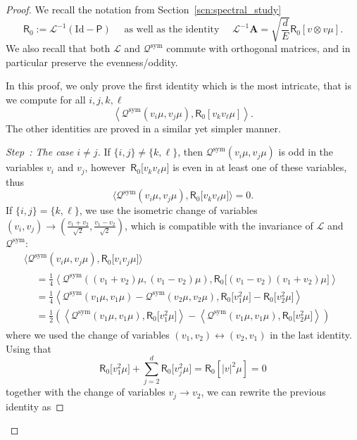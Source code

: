 \documentclass[10pt]{amsart}
\theoremstyle{definition}\newtheorem{defi}[theo]{Definition}\newtheorem{rema}[theo]{Remark}\newtheorem{exam}[theo]{Example}\newtheorem{exem}[theo]{Example}\newtheorem{nota}[theo]{Notation}
\newcommand{\sym}{\mathrm{sym}}
\newcommand{\Id}{\mathrm{Id}}
\newcommand{\sfR}{\mathsf{R}}
\newcommand{\BurA}{{\mathbf{A}}}
\newcommand{\LL}{\mathcal{L}}
\newcommand{\PP}{\mathsf{P}}
\newcommand{\QQ}{\mathcal{Q}}
\newcommand{\la}{\langle}
\newcommand{\ra}{\rangle}
\newcounter{stepcount}
\newenvironment{step}[1]{\refstepcounter{stepcount}\begin{proof}[Step~\thestepcount: #1]}{\let\qed\relax\end{proof}}
\begin{document}
\begin{proof}
We recall the notation from Section~\ref{scn:spectral_study}
\[
\sfR_0 := \LL^{-1} \left(\Id - \PP\right) \quad \text{ as well as the identity } \quad \LL^{-1}\BurA = \sqrt{ \frac{d}{E} } \sfR_0 \left[v \otimes v \mu \right].
\]
We also recall that both $\LL$ and $\QQ^\sym$ commute with orthogonal matrices, and in particular preserve the evenness/oddity.

In this proof, we only prove the first identity which is the most intricate, that is we compute for all $i, j, k, \ell$
\[
\left\la \QQ^\sym(v_i \mu, v_j \mu), \sfR_0 \left[v_k v_\ell \mu \right] \right\ra.
\]
The other identities are proved in a similar yet simpler manner.

\setcounter{stepcount}{0}
\begin{step}{{The case $i \neq j$}}
If $\{ i, j \} \neq \{ k, \ell \}$, then $\QQ^\sym(v_i \mu, v_j \mu)$ is odd in the variables $v_i$ and $v_j$, however~$\sfR_0 \big[v_k v_\ell \mu \big]$ is even in at least one of these variables, thus
\[
\big\la \QQ^\sym(v_i \mu, v_j \mu), \sfR_0 \big[v_k v_\ell \mu \big] \big\ra = 0.
\]
If $\{ i, j \} = \{ k, \ell \}$, we use the isometric change of variables $(v_i, v_j) \rightarrow \left(\frac{v_1 + v_2}{\sqrt{2} }, \frac{v_1 - v_2}{\sqrt{2} } \right)$, which is compatible with the invariance of $\LL$ and $\QQ^\sym$:
\begin{multline*}
\big\la \QQ^\sym(v_i \mu, v_j \mu), \sfR_0 \big[v_i v_j \mu \big] \big\ra\\
\begin{aligned}
&= \frac{1}{4} \left\la \QQ^\sym((v_1 + v_2) \mu, (v_1 - v_2) \mu), \sfR_0 \big[(v_1-v_2) (v_1 + v_2) \mu \big] \right\ra \\
&= \frac{1}{4} \left\langle \QQ^\sym(v_1 \mu, v_1 \mu) - \QQ^\sym(v_2 \mu, v_2 \mu), \sfR_0 \big[v_1^2 \mu \big] - \sfR_0 \big[v_2^2 \mu \big] \right\rangle \\
&= \frac{1}{2} \left(\left\la \QQ^\sym(v_1 \mu, v_1 \mu), \sfR_0 \big[v_1^2 \mu \big] \right\ra - \left\la \QQ^\sym(v_1 \mu, v_1 \mu), \sfR_0 \big[v_2^2 \mu \big] \right\ra\right)
\end{aligned}
\end{multline*}
where we used the change of variables $(v_1, v_2) \leftrightarrow (v_2, v_1)$ in the last identity. Using that
\[
\sfR_0 \big[v_1^2 \mu \big] + \sum_{j = 2}^d \sfR_0 \big[v_j^2 \mu \big] = \sfR_0 \left[|v|^2 \mu \right] = 0
\]
together with the change of variables $v_j \rightarrow v_2$, we can rewrite the previous identity as

\end{step}
\end{proof}
\end{document}
